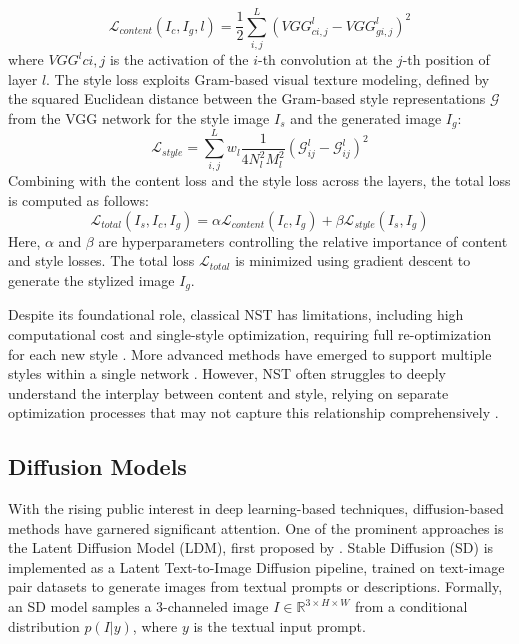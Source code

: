 \begin{equation}
    \mathcal{L}_{content} (I_c, I_g, l) = \frac{1}{2} \sum^{L}_{i,j} (VGG^{l}_{ci,j} -VGG^{l}_{gi,j} )^2
\end{equation}
where $VGG^l{ci,j}$ is the activation of the $i$-th convolution at the $j$-th position of layer $l$. The style loss exploits Gram-based visual texture modeling, defined by the squared Euclidean distance between the Gram-based style representations $\mathcal{G}$ from the VGG network for the style image $I_s$ and the generated image $I_g$:
\begin{equation}
    \mathcal{L}_{style} = \sum^{L}_{i,j} w_l \frac{1}{4N^2_l M^2_l} (\mathcal{G}^{l}_{ij} - \mathcal{G}^{l}_{ij})^2
\end{equation}
Combining with the content loss and the style loss across the layers, the  total loss is computed as follows:
\begin{equation}
    \mathcal{L}_{total}(I_s,I_c,I_g) = \alpha \mathcal{L}_{content}(I_c,I_g) + \beta \mathcal{L}_{style}(I_s,I_g)
\end{equation}
Here, $\alpha$ and $\beta$ are hyperparameters controlling the relative importance of content and style losses. The total loss $\mathcal{L}_{total}$ is minimized using gradient descent to generate the stylized image $I_g$.

Despite its foundational role, classical NST has limitations, including high computational cost and single-style optimization, requiring full re-optimization for each new style . More advanced methods have emerged to support multiple styles within a single network . However, NST often struggles to deeply understand the interplay between content and style, relying on separate optimization processes that may not capture this relationship comprehensively .

\subsection{Diffusion Models}

With the rising public interest in deep learning-based techniques, diffusion-based methods have garnered significant attention. One of the prominent approaches is the Latent Diffusion Model (LDM), first proposed by \textcite{Rombach.2022}. Stable Diffusion (SD) is implemented as a Latent Text-to-Image Diffusion pipeline, trained on text-image pair datasets to generate images from textual prompts or descriptions. Formally, an SD model samples a 3-channeled image $I \in \mathbb{R}^{3 \times H \times W}$ from a conditional distribution $p(I | y)$, where $y$ is the textual input prompt.

